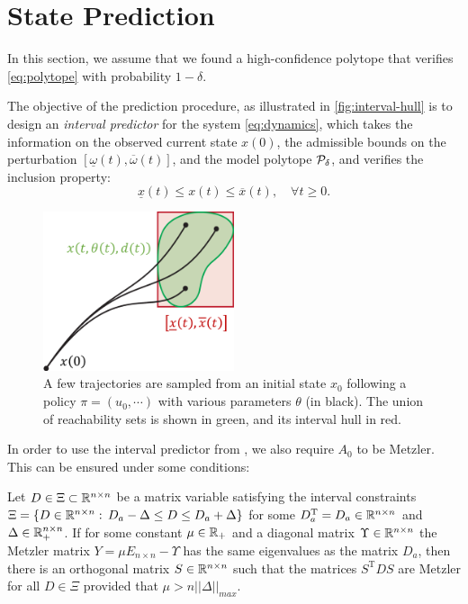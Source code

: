 \documentclass{article}
\begin{document}
\section{State Prediction}

In this section, we assume that we found a high-confidence polytope that verifies \eqref{eq:polytope} with probability $1-\delta$.

The objective of the prediction procedure, as illustrated in \autoref{fig:interval-hull} is to design an \emph{interval predictor} for the system \eqref{eq:dynamics}, which takes the information on the observed current state ${x}({0})$, the admissible bounds on the perturbation $[\underline{\omega}(t),\overline{\omega}(t)]$, and the model polytope $\mathcal{P}_\delta$, and verifies the inclusion property:
\begin{equation}
\label{eq:interval_property}
\underline{x}(t)\leq x(t)\leq\overline{x}(t),\quad\forall t\geq0.
\end{equation}

\begin{figure}
    \centering
    \includegraphics[width=0.5\textwidth]{img/interval-hull}
    \caption{A few trajectories are sampled from an initial state $x_0$ following a policy $\pi=(u_0,\cdots)$ with various parameters $\theta$ (in black). The union of reachability sets is shown in green, and its interval hull in red.}
    \label{fig:interval-hull}
\end{figure}

In order to use the interval predictor from \citep{leurent2019interval}, we also require $A_0$ to be Metzler. This can be ensured under some conditions:

\begin{lemma}
\label{lem:metzler} Let $D\in\Xi\subset\mathbb{R}^{n\times n}$ be a matrix variable satisfying the interval constraints $\Xi=\{D\in\mathbb{R}^{n\times n}:\,D_{a}-\Delta\le D\le D_{a}+\Delta\}$ for some $D_{a}^{\text{T}}=D_{a}\in\mathbb{R}^{n\times n}$ and $\Delta\in\mathbb{R}_{+}^{n\times n}$. If for some constant $\mu\in\mathbb{R}_{+}$ and a diagonal matrix $\Upsilon\in\mathbb{R}^{n\times n}$ the Metzler matrix $Y=\mu E_{n\times n}-\Upsilon$ has the same eigenvalues as the matrix $D_{a}$, then there is an orthogonal matrix $S\in\mathbb{R}^{n\times n}$ such that the matrices $S^{\text{T}}DS$ are Metzler for all $D\in\Xi$ provided that $\mu>n||\Delta||_{max}$.\textup{ }
\end{lemma}
\end{document}
